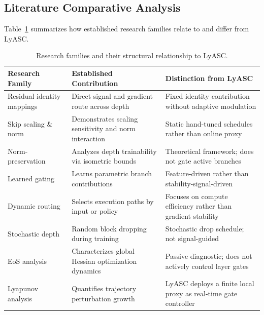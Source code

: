 \documentclass[conference,10pt]{IEEEtran}
\begin{document}
\subsection{Literature Comparative Analysis}

Table~\ref{tab:lit_comparison} summarizes how established research families
relate to and differ from LyASC.

\begin{table}[t]
\centering
\caption{Research families and their structural relationship to LyASC.}
\label{tab:lit_comparison}
\begin{tabular}{p{2.2cm}p{2.6cm}p{2.8cm}}
\toprule
\textbf{Research Family} & \textbf{Established Contribution} & \textbf{Distinction from LyASC} \\
\midrule
Residual identity mappings~\cite{he2016deep, he2016identity} & Direct signal and gradient route across depth & Fixed identity contribution without adaptive modulation \\
\addlinespace
Skip scaling \& norm~\cite{liu2021rethinking, macdonald2023skip} & Demonstrates scaling sensitivity and norm interaction & Static hand-tuned schedules rather than online proxy \\
\addlinespace
Norm-preservation~\cite{zaeemzadeh2020norm} & Analyzes depth trainability via isometric bounds & Theoretical framework; does not gate active branches \\
\addlinespace
Learned gating~\cite{srivastava2015highway, hu2018squeeze} & Learns parametric branch contributions & Feature-driven rather than stability-signal-driven \\
\addlinespace
Dynamic routing~\cite{wang2018skipnet, veit2020adaptive} & Selects execution paths by input or policy & Focuses on compute efficiency rather than gradient stability \\
\addlinespace
Stochastic depth~\cite{huang2016deep} & Random block dropping during training & Stochastic drop schedule; not signal-guided \\
\addlinespace
EoS analysis~\cite{cohen2021gradient, arora2022understanding, damian2022self} & Characterizes global Hessian optimization dynamics & Passive diagnostic; does not actively control layer gates \\
\addlinespace
Lyapunov analysis~\cite{nar2018residual, mittra2024utilizing} & Quantifies trajectory perturbation growth & LyASC deploys a finite local proxy as real-time gate controller \\
\bottomrule
\end{tabular}
\end{table}
\end{document}
